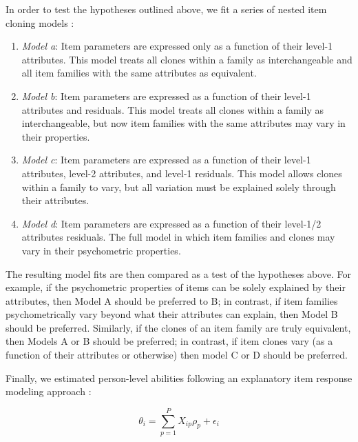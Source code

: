 \documentclass[a4paper,man,natbib]{apa6}
\begin{document}
In order to test the hypotheses outlined above, we fit a series of nested item cloning models \citep{cho2014additive, lathrop2017item}: 

\begin{enumerate}

\item \textit{Model a}: Item parameters are expressed only as a function of their level-1 attributes. This model treats all clones within a family as interchangeable and all item families with the same attributes as equivalent. 

\item \textit{Model b}: Item parameters are expressed as a function of their level-1 attributes and residuals. This model treats all clones within a family as interchangeable, but now item families with the same attributes may vary in their properties. 

\item \textit{Model c}: Item parameters are expressed as a function of their level-1 attributes, level-2 attributes, and level-1 residuals. This model allows clones within a family to vary, but all variation must be explained solely through their attributes.  

\item \textit{Model d}: Item parameters are expressed as a function of their level-1/2 attributes residuals. The full model in which item families and clones may vary in their psychometric properties. 

\end{enumerate}

The resulting model fits are then compared as a test of the hypotheses above. For example, if the psychometric properties of items can be solely explained by their attributes, then Model A should be preferred to B; in contrast, if item families psychometrically vary beyond what their attributes can explain, then Model B should be preferred. Similarly, if the clones of an item family are truly equivalent, then Models A or B should be preferred; in contrast, if item clones vary (as a function of their attributes or otherwise) then model C or D should be preferred. 

Finally, we estimated person-level abilities following an explanatory item response modeling approach \citep{wilson2008explanatory}:   

\begin{equation}
\theta_i = \sum_{p=1}^P X_{ip} \rho_p + \epsilon_i    
\end{equation}
\end{document}
